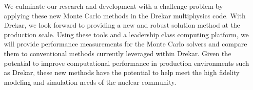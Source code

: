 We culminate our research and development with a challenge problem by
applying these new Monte Carlo methods in the Drekar multiphysics
code. With Drekar, we look forward to providing a new and robust
solution method at the production scale. Using these tools and a
leadership class computing platform, we will provide performance
measurements for the Monte Carlo solvers and compare them to
conventional methods currently leveraged within Drekar. Given the
potential to improve computational performance in production
environments such as Drekar, these new methods have the potential to
help meet the high fidelity modeling and simulation needs of the
nuclear community.
